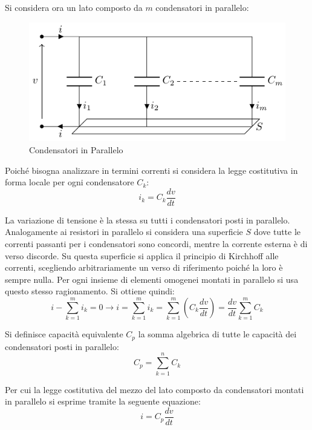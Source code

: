 \documentclass{article}
\numberwithin{equation}{subsection}
\begin{document}
Si considera ora un lato composto da $m$ condensatori in parallelo:
\begin{figure}[H]%
    \centering
    \includegraphics{condensatore-parallelo.pdf}%
    \caption{Condensatori in Parallelo}
    \label{fig:condensatore-parallelo}
\end{figure}

Poiché bisogna analizzare in termini correnti si considera la legge costitutiva in forma locale per ogni condensatore $C_k$:
\begin{equation*}
    i_k=C_k\displaystyle\frac{dv}{dt}
\end{equation*}

La variazione di tensione è la stessa su tutti i condensatori posti in parallelo. Analogamente ai resistori in parallelo si considera una superficie $S$ dove tutte le correnti 
passanti per i condensatori sono concordi, mentre la corrente esterna è di verso discorde. Su questa superficie si applica il principio di Kirchhoff alle correnti, scegliendo 
arbitrariamente un verso di riferimento poiché la loro è sempre nulla. Per ogni insieme di elementi omogenei montati in parallelo si usa questo stesso ragionamento. 
Si ottiene quindi:
\begin{equation*}
    i-\displaystyle\sum_{k=1}^mi_k=0\to i=\sum_{k=1}^mi_k=\sum_{k=1}^m\left(C_k\frac{dv}{dt}\right)=\frac{dv}{dt}\sum_{k=1}^mC_k
\end{equation*}

Si definisce capacità equivalente $C_p$ la somma algebrica di tutte le capacità dei condensatori posti in parallelo:
\begin{equation*}
    C_p=\displaystyle\sum_{k=1}^nC_k
\end{equation*}

Per cui la legge costitutiva del mezzo del lato composto da condensatori montati in parallelo si esprime tramite la seguente equazione:
\begin{equation}
    i=C_p\displaystyle\frac{dv}{dt}
\end{equation}
\end{document}
